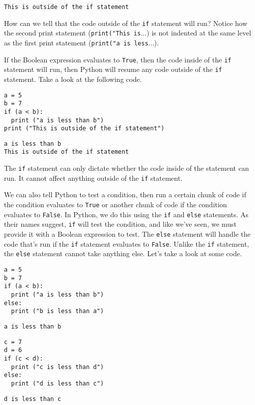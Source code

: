 \begin{lstlisting}
This is outside of the if statement
\end{lstlisting}
How can we tell that the code outside of the \verb|if| statement will run? Notice how the second print statement (\verb|print("This is|...) is not indented at the same level as the first print statement (\verb|print("a is less|...).\par
If the Boolean expression evaluates to \verb|True|, then the code inside of the \verb|if| statement will run, then Python will resume any code outside of the \verb|if| statement. Take a look at the following code.\par
\begin{lstlisting}[style=pippython]
a = 5
b = 7
if (a < b):
  print ("a is less than b")
print ("This is outside of the if statement")
\end{lstlisting}
\begin{lstlisting}
a is less than b
This is outside of the if statement
\end{lstlisting}
The \verb|if| statement can only dictate whether the code inside of the statement can run. It cannot affect anything outside of the \verb|if| statement.\par
We can also tell Python to test a condition, then run a certain chunk of code if the condition evaluates to \verb|True| or another chunk of code if the condition evaluates to \verb|False|. In Python, we do this using the \verb|if| and \verb|else| statements. As their names suggest, \verb|if| will test the condition, and like we've seen, we must provide it with a Boolean expression to test. The \verb|else| statement will handle the code that's run if the \verb|if| statement evaluates to \verb|False|. Unlike the \verb|if| statement, the \verb|else| statement cannot take anything else. Let's take a look at some code.\par
\begin{lstlisting}[style=pippython]
a = 5
b = 7
if (a < b):
  print ("a is less than b")
else:
  print ("b is less than a")
\end{lstlisting}
\begin{lstlisting}
a is less than b
\end{lstlisting}
\begin{lstlisting}[style=pippython]
c = 7
d = 6
if (c < d):
  print ("c is less than d")
else:
  print ("d is less than c")
\end{lstlisting}
\begin{lstlisting}
d is less than c
\end{lstlisting}
